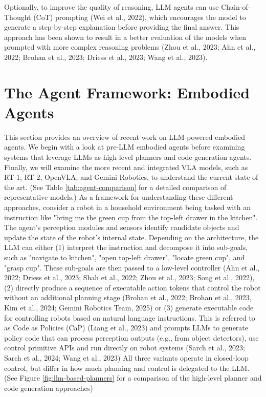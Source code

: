 \documentclass[11pt]{article}
\begin{document}
Optionally, to improve the quality of reasoning, LLM agents can use Chain-of-Thought (CoT) prompting (Wei et al., 2022), which encourages the model to generate a step-by-step explanation before providing the final answer. This approach has been shown to result in a better evaluation of the models when prompted with more complex reasoning problems (Zhou et al., 2023; Ahn et al., 2022; Brohan et al., 2023; Driess et al., 2023; Wang et al., 2023).



\section{The Agent Framework: Embodied Agents}
This section provides an overview of recent work on LLM-powered embodied agents. We begin with a look at pre-LLM embodied agents before examining systems that leverage LLMs as high-level planners and code-generation agents. Finally, we will examine the more recent and integrated VLA models, such as RT-1, RT-2, OpenVLA, and Gemini Robotics, to understand the current state of the art. (See Table \ref{tab:agent-comparison} for a detailed comparison of representative models.)
\newline
As a framework for understanding these different approaches, consider a robot in a household environment being tasked with an instruction like "bring me the green cup from the top-left drawer in the kitchen". The agent's perception modules and sensors identify candidate objects and update the state of the robot's internal state. Depending on the architecture, the LLM can either  
\newline
(1) interpret the instruction and decompose it into sub-goals, such as "navigate to kitchen", "open top-left drawer", "locate green cup", and "grasp cup". These sub-goals are then passed to a low-level controller (Ahn et al., 2022; Driess et al., 2023; Shah et al., 2022; Zhou et al., 2023; Song et al., 2022),
\newline 
(2) directly produce a sequence of executable action tokens that control the robot without an additional planning stage (Brohan et al., 2022; Brohan et al., 2023, Kim et al., 2024; Gemini Robotics Team, 2025) or
\newline 
(3) generate executable code for controlling robots based on natural language instructions. This is referred to as Code as Policies (CaP) (Liang et al., 2023) and prompts LLMs to generate policy code that can process perception outputs (e.g., from object detectors), use control primitive APIs and run directly on robot systems (Sarch et al., 2023; Sarch et al., 2024; Wang et al., 2023) 
\hfill \break
All three variants operate in closed-loop control, but differ in how much planning and control is delegated to the LLM. (See Figure \ref{fig:llm-based-planners} for a comparison of the high-level planner and code generation approaches)
\newline
\end{document}
